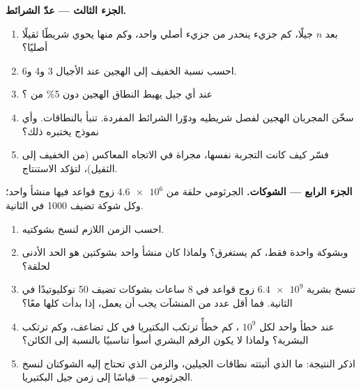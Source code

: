 \begin{problem}
\medskip
\noindent\textbf{الجزء الثالث --- عدّ الشرائط.}
\begin{enumerate}[resume]
  \item بعد $n$ جيلًا، كم جزيء  ينحدر من جزيء أصلي واحد، وكم منها
        يحوي شريطًا ثقيلًا أصليًا؟
  \item احسب نسبة الخفيف إلى الهجين عند الأجيال 3 و4 و6.
  \item عند أي جيل يهبط النطاق الهجين دون 5\% من ؟
  \item سخّن المجربان  الهجين لفصل شريطيه ودوّرا الشرائط المفردة.
        تنبأ بالنطاقات. وأي نموذج يختبره ذلك؟
  \item فسّر كيف كانت التجربة نفسها، مجراة في الاتجاه المعاكس (من
        الخفيف إلى الثقيل)، لتؤكد الاستنتاج.
\end{enumerate}

\medskip
\noindent\textbf{الجزء الرابع --- الشوكات.}
 الجرثومي حلقة من $\num{4.6e6}$ زوج قواعد فيها منشأ واحد؛ وكل
شوكة تضيف 1000  في الثانية.
\begin{enumerate}[resume]
  \item احسب الزمن اللازم لنسخ  بشوكتيه.
  \item وبشوكة واحدة فقط، كم يستغرق؟ ولماذا كان منشأ واحد بشوكتين هو
        الحد الأدنى لحلقة؟
  \item تنسخ  بشرية $\num{6.4e9}$ زوج قواعد في 8 ساعات بشوكات
        تضيف 50 نوكليوتيدًا في الثانية. فما أقل عدد من المنشآت يجب أن
        يعمل، إذا بدأت كلها معًا؟
  \item عند خطأ واحد لكل $10^9$ ، كم خطأً ترتكب البكتيريا في
        كل تضاعف، وكم ترتكب  البشرية؟ ولماذا لا يكون الرقم
        البشري أسوأ تناسبيًا بالنسبة إلى الكائن؟
  \item اذكر النتيجة: ما الذي أثبتته نطاقات الجيلين، والزمن الذي
        تحتاج إليه الشوكتان لنسخ  الجرثومي --- قياسًا إلى زمن
        جيل البكتيريا.
\end{enumerate}
\end{problem}

